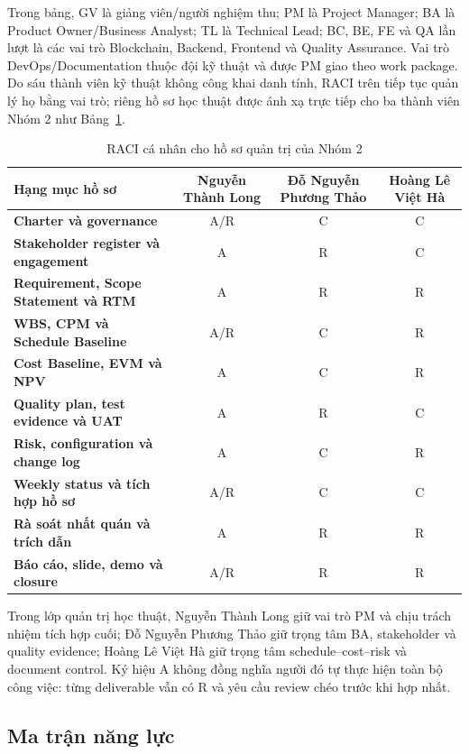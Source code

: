 Trong bảng, GV là giảng viên/người nghiệm thu; PM là Project Manager; BA là Product Owner/Business Analyst; TL là Technical Lead; BC, BE, FE và QA lần lượt là các vai trò Blockchain, Backend, Frontend và Quality Assurance. Vai trò DevOps/Documentation thuộc đội kỹ thuật và được PM giao theo work package. Do sáu thành viên kỹ thuật không công khai danh tính, RACI trên tiếp tục quản lý họ bằng vai trò; riêng hồ sơ học thuật được ánh xạ trực tiếp cho ba thành viên Nhóm 2 như Bảng~\ref{tab:student-raci}.

\begin{table}[H]
\centering
\caption{RACI cá nhân cho hồ sơ quản trị của Nhóm 2}
\label{tab:student-raci}
\begin{tabularx}{\textwidth}{| >{\bfseries}X | c | c | c |}
\hline
Hạng mục hồ sơ & Nguyễn Thành Long & Đỗ Nguyễn Phương Thảo & Hoàng Lê Việt Hà \\
\hline
Charter và governance & A/R & C & C \\ \hline
Stakeholder register và engagement & A & R & C \\ \hline
Requirement, Scope Statement và RTM & A & R & R \\ \hline
WBS, CPM và Schedule Baseline & A/R & C & R \\ \hline
Cost Baseline, EVM và NPV & A & C & R \\ \hline
Quality plan, test evidence và UAT & A & R & C \\ \hline
Risk, configuration và change log & A & C & R \\ \hline
Weekly status và tích hợp hồ sơ & A/R & C & C \\ \hline
Rà soát nhất quán và trích dẫn & A & R & R \\ \hline
Báo cáo, slide, demo và closure & A/R & R & R \\
\hline
\end{tabularx}
\end{table}

Trong lớp quản trị học thuật, Nguyễn Thành Long giữ vai trò PM và chịu trách nhiệm tích hợp cuối; Đỗ Nguyễn Phương Thảo giữ trọng tâm BA, stakeholder và quality evidence; Hoàng Lê Việt Hà giữ trọng tâm schedule--cost--risk và document control. Ký hiệu A không đồng nghĩa người đó tự thực hiện toàn bộ công việc: từng deliverable vẫn có R và yêu cầu review chéo trước khi hợp nhất.

\iffalse
\subsection{Ma trận năng lực}

